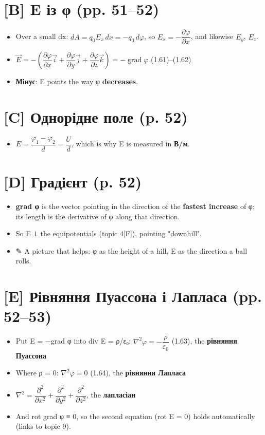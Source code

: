 \documentclass[11pt,a4paper,oneside]{book}
\newcommand{\pen}{{\sffamily\color{accent}✎}}
\begin{document}
\section*{[B] E із φ (pp. 51–52)}
\begin{itemize}
\item Over a small dx: $dA = q_0E_x\,dx = -q_0\,d\varphi$, so $E_x = -\dfrac{\partial\varphi}{\partial x}$, and likewise $E_y$, $E_z$.
\item $\vec E = -\left(\dfrac{\partial\varphi}{\partial x}\vec i + \dfrac{\partial\varphi}{\partial y}\vec j + \dfrac{\partial\varphi}{\partial z}\vec k\right) = -\operatorname{grad}\varphi$ (1.61)–(1.62)
\item \textbf{Мінус}: E points the way φ \textbf{decreases}.
\end{itemize}

\section*{[C] Однорідне поле (p. 52)}
\begin{itemize}
\item $E = \dfrac{\varphi_1-\varphi_2}{d} = \dfrac{U}{d}$, which is why E is measured in \textbf{В/м}.
\end{itemize}

\section*{[D] Градієнт (p. 52)}
\begin{itemize}
\item \textbf{grad φ} is the vector pointing in the direction of the \textbf{fastest increase} of φ; its length is the derivative of φ along that direction.
\item So E ⟂ the equipotentials (topic 4[F]), pointing "downhill".
\item \pen{} A picture that helps: φ as the height of a hill, E as the direction a ball rolls.
\end{itemize}

\section*{[E] Рівняння Пуассона і Лапласа (pp. 52–53)}
\begin{itemize}
\item Put E = −grad φ into div E = ρ/ε₀:
$\nabla^2\varphi = -\dfrac{\rho}{\varepsilon_0}$ (1.63), the \textbf{рівняння Пуассона}
\item Where ρ = 0: $\nabla^2\varphi = 0$ (1.64), the \textbf{рівняння Лапласа}
\item $\nabla^2 = \dfrac{\partial^2}{\partial x^2}+\dfrac{\partial^2}{\partial y^2}+\dfrac{\partial^2}{\partial z^2}$, the \textbf{лапласіан}
\item And rot grad φ ≡ 0, so the second equation (rot E = 0) holds automatically (links to topic 9).
\end{itemize}
\end{document}
